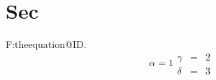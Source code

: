 \documentclass[seceq]{ptptex}
\begin{document}
\section{Sec}
\makeatletter
F:\expandafter\meaning\csname theequation@ID\endcsname.
\makeatother
\begin{subequations}
\label{eq:1}
\begin{equation}
\alpha=1 \label{eq:1a}
\end{equation}
\begin{eqnarray}
\gamma &=& 2 \\
\delta &=& 3
\end{eqnarray}
\end{subequations}
\end{document}

